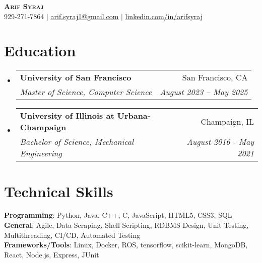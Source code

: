 \documentclass[letterpaper,11pt]{article}
\makeatletter
\newcommand{\resumeSubheading}[4]{
  \vspace{-3pt}\item
    \begin{tabular*}{0.97\textwidth}[t]{l@{\extracolsep{\fill}}r}
      \textbf{#1} & #2 \\
      \textit{\small#3} & \textit{\small #4} \\
    \end{tabular*}\vspace{-7pt}
}
\newcommand{\resumeSubHeadingListStart}
{\begin{itemize}[leftmargin=0.05in, label={}]}
\newcommand{\resumeSubHeadingListEnd}{\end{itemize}}
\makeatother
\begin{document}

\begin{center}
  \textbf{\Huge \scshape Arif Syraj} \\ \vspace{1pt}
  \small 929-271-7864 $|$ \href{mailto:arif.syraj1@gmail.com}{\underline{arif.syraj1@gmail.com}} $|$
  \href{https://linkedin.com/in/...}{\underline{linkedin.com/in/arifsyraj}} %
\end{center}


\section{Education}
\resumeSubHeadingListStart
\resumeSubheading
{University of San Francisco}{San Francisco, CA}
{Master of Science, Computer Science}{August 2023 -- May 2025}

\resumeSubheading
{University of Illinois at Urbana-Champaign}{Champaign, IL}
{Bachelor of Science, Mechanical Engineering}{August 2016 - May 2021}

\resumeSubHeadingListEnd

\section{Technical Skills}
\begin{itemize}[leftmargin=0.15in, label={}]
  \small{\item{
        \textbf{Programming}{: Python, Java, C++, C, JavaScript, HTML5, CSS3, SQL} \\
        \textbf{General}{: Agile, Data Scraping, Shell Scripting, RDBMS Design, Unit Testing, Multithreading, CI/CD, Automated Testing} \\
        \textbf{Frameworks/Tools}{: Linux, Docker, ROS, tensorflow, scikit-learn, MongoDB, React, Node.js, Express, JUnit}
        }}
\end{itemize}
\end{document}
